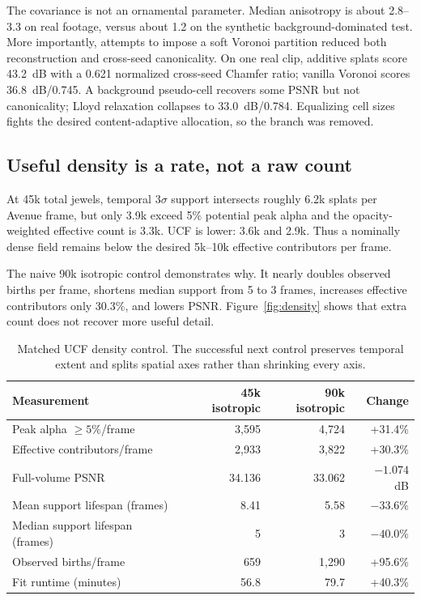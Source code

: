 \documentclass[10pt]{article}
\begin{document}
The covariance is not an ornamental parameter. Median anisotropy is about 2.8--3.3 on real footage,
versus about 1.2 on the synthetic background-dominated test. More importantly, attempts to impose a
soft Voronoi partition reduced both reconstruction and cross-seed canonicality. On one real clip,
additive splats score \SI{43.2}{dB} with a 0.621 normalized cross-seed Chamfer ratio; vanilla
Voronoi scores \SI{36.8}{dB}/0.745. A background pseudo-cell recovers some PSNR but not canonicality;
Lloyd relaxation collapses to \SI{33.0}{dB}/0.784. Equalizing cell sizes fights the desired
content-adaptive allocation, so the branch was removed.

\subsection{Useful density is a rate, not a raw count}

At 45k total jewels, temporal $3\sigma$ support intersects roughly 6.2k splats per Avenue frame, but
only 3.9k exceed 5\% potential peak alpha and the opacity-weighted effective count is 3.3k. UCF is
lower: 3.6k and 2.9k. Thus a nominally dense field remains below the desired 5k--10k effective
contributors per frame.

The naive 90k isotropic control demonstrates why. It nearly doubles observed births per frame,
shortens median support from 5 to 3 frames, increases effective contributors only 30.3\%, and lowers
PSNR. Figure~\ref{fig:density} shows that extra count does not recover more useful detail.

\begin{table}[H]
\centering
\small
\caption{Matched UCF density control. The successful next control preserves temporal extent and
splits spatial axes rather than shrinking every axis.}
\label{tab:density}
\begin{tabular}{@{}lrrr@{}}
\toprule
Measurement & 45k isotropic & 90k isotropic & Change \\
\midrule
Peak alpha $\geq5\%$/frame & 3,595 & 4,724 & +31.4\% \\
Effective contributors/frame & 2,933 & 3,822 & +30.3\% \\
Full-volume PSNR & 34.136 & 33.062 & $-1.074$ dB \\
Mean support lifespan (frames) & 8.41 & 5.58 & $-33.6\%$ \\
Median support lifespan (frames) & 5 & 3 & $-40.0\%$ \\
Observed births/frame & 659 & 1,290 & +95.6\% \\
Fit runtime (minutes) & 56.8 & 79.7 & +40.3\% \\
\bottomrule
\end{tabular}
\end{table}
\end{document}
